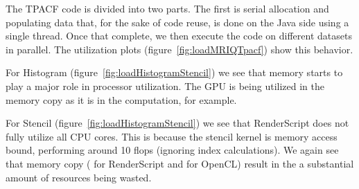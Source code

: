 The TPACF code is divided into two parts.
The first is serial allocation and populating data
  that, for the sake of code reuse, is done on the 
  Java side using a single thread.
Once that complete, we then execute the code on different datasets in parallel.
The utilization plots (figure~\ref{fig:loadMRIQTpacf}) show this behavior.  

For Histogram (figure~\ref{fig:loadHistogramStencil}) we see that memory starts
  to play a major role in processor utilization.
The GPU is being utilized in the memory copy as it is in the computation, for example.

For Stencil (figure~\ref{fig:loadHistogramStencil}) we see that RenderScript does
  not fully utilize all CPU cores.
This is because the stencil kernel is memory access bound, performing around 10 flops 
  (ignoring index calculations).
We again see that memory copy ( for RenderScript and
   for OpenCL) result in the a substantial amount of resources being
  wasted.

